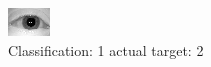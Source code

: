 \begin{figure}[h!]
\begin{center}
\includegraphics[width=0.60\columnwidth]{figures/ID926_class_1_target_2.png}
\end{center}
\caption{ Classification: 1 actual target: 2}
\label{fig:ID926_class_1_target_2}
\end{figure}
